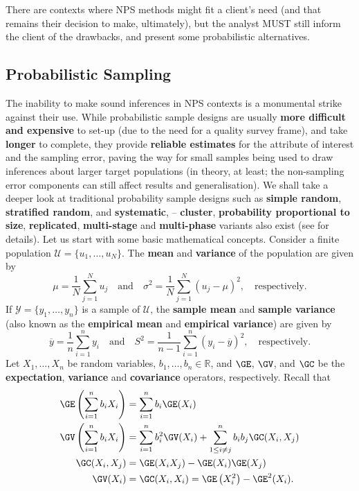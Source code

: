 There are contexts where NPS methods might fit a client's need (and that remains their decision to make, ultimately), but the analyst MUST still inform the client of the drawbacks, and present some  probabilistic alternatives.  
\subsection{Probabilistic Sampling}
The inability to make sound inferences in NPS contexts is a monumental strike against their use. While probabilistic sample designs are usually \textbf{more difficult and expensive} to set-up (due to the need for a quality survey frame), and take \textbf{longer} to complete, they provide \textbf{reliable estimates} for the attribute of interest and the sampling error, paving the way for  small samples being used to draw inferences about  larger target populations (in theory, at least; the non-sampling error components can still affect results and generalisation). \newl We shall take a deeper look at traditional probability sample designs such as \textbf{simple random}, \textbf{stratified random}, and \textbf{systematic},   -- \textbf{cluster}, \textbf{probability proportional to size}, \textbf{replicated}, \textbf{multi-stage} and \textbf{multi-phase} variants also exist (see \cite{DC_F,DC_SC} for details).\newl
Let us start with some basic mathematical concepts. Consider a finite population $\mathcal{U}=\{u_1,\ldots,u_N\}$. The \textbf{mean} and \textbf{variance} of the population are given by 
$$\mu=\frac{1}{N}\sum_{j=1}^Nu_j\quad\mbox{and}\quad \sigma^2=\frac{1}{N}\sum_{j=1}^N(u_j-\mu)^2, \quad\mbox{respectively.}$$ If $\mathcal{Y}=\{y_1,\ldots,y_n\}$ is a sample of $\mathcal{U}$, the \textbf{sample mean} and \textbf{sample variance} (also known as the \textbf{empirical mean} and \textbf{empirical variance}) are given by 
$$\overline{y}=\frac{1}{n}\sum_{i=1}^ny_i\quad\mbox{and}\quad S^2=\frac{1}{n-1}\sum_{i=1}^n(y_i-\overline{y})^2, \quad\mbox{respectively.}$$ Let $X_1,\ldots,X_n$ be random variables, $b_1,\ldots,b_n\in \mathbb{R}$, and $\GE$, $\GV$, and $\GC$ be the \textbf{expectation}, \textbf{variance} and \textbf{covariance} operators, respectively. Recall that 
\begin{align*}
    \GE \left(\sum_{i=1}^nb_iX_i\right) &=\sum_{i=1}^nb_i\GE(X_i) \\
    \GV\left(\sum_{i=1}^nb_iX_i\right)&=\sum_{i=1}^n b_i^2\GV(X_i)+\sum_{1\leq i\neq j}^nb_ib_j\GC(X_i,X_j) \\
\GC(X_i,X_j)&=\GE(X_iX_j)-\GE(X_i)\GE(X_j)\\
\GV(X_i)&=\GC(X_i,X_i)=\GE\left(X_i^2\right)-\GE^2(X_i).
\end{align*}
